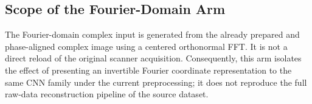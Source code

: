 \subsection{Scope of the Fourier-Domain Arm}
The Fourier-domain complex input is generated from the already prepared and phase-aligned complex image using a centered orthonormal FFT. It is not a direct reload of the original scanner acquisition. Consequently, this arm isolates the effect of presenting an invertible Fourier coordinate representation to the same CNN family under the current preprocessing; it does not reproduce the full raw-data reconstruction pipeline of the source dataset.

